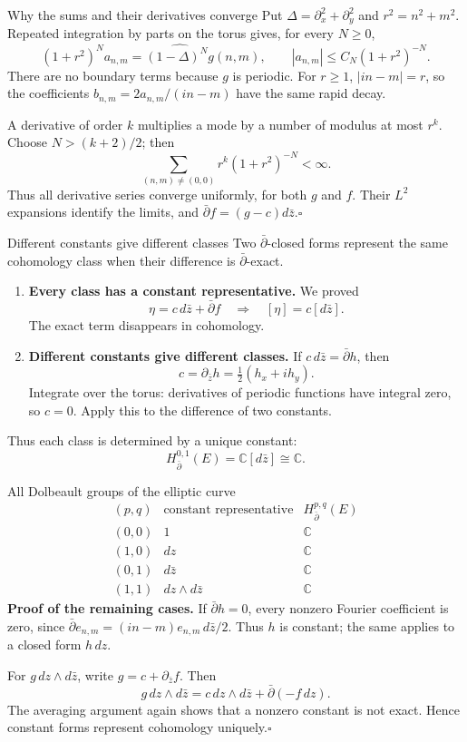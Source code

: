 \documentclass[aspectratio=169,11pt]{beamer}
\newcommand{\db}{\bar\partial}
\newcommand{\C}{\mathbb C}
\newcommand{\ee}{e_{n,m}}
\newcommand{\pbarz}{\partial_{\bar z}}
\begin{document}
\begin{frame}{Why the sums and their derivatives converge}
Put $\Delta=\partial_x^2+\partial_y^2$ and $r^2=n^2+m^2$.
Repeated integration by parts on the torus gives, for every $N\geq0$,
\[
 (1+r^2)^N a_{n,m}=\widehat{(1-\Delta)^N g}(n,m),
 \qquad |a_{n,m}|\leq C_N(1+r^2)^{-N}.
\]
There are no boundary terms because $g$ is periodic.
For $r\geq1$, $|in-m|=r$, so the coefficients
$b_{n,m}=2a_{n,m}/(in-m)$ have the same rapid decay.

A derivative of order $k$ multiplies a mode by a number of modulus at most
$r^k$. Choose $N>(k+2)/2$; then
\[
 \sum_{(n,m)\ne(0,0)} r^k(1+r^2)^{-N}<\infty.
\]
Thus all derivative series converge uniformly, for both $g$ and $f$.
Their $L^2$ expansions identify the limits, and $\db f=(g-c)d\bar z$.\hfill$\square$
\end{frame}

\begin{frame}{Different constants give different classes}
Two $\db$-closed forms represent the same cohomology class when their
difference is $\db$-exact.

\begin{enumerate}
\item \textbf{Every class has a constant representative.}
We proved
\[
 \eta=c\,d\bar z+\db f
 \quad\Longrightarrow\quad [\eta]=c[d\bar z].
\]
The exact term disappears in cohomology.

\item \textbf{Different constants give different classes.}
If $c\,d\bar z=\db h$, then
\[
 c=\pbarz h=\tfrac12(h_x+i h_y).
\]
Integrate over the torus: derivatives of periodic functions have
integral zero, so $c=0$. Apply this to the difference of two constants.
\end{enumerate}

Thus each class is determined by a unique constant:
\[
 H^{0,1}_{\db}(E)=\C[d\bar z]\cong\C.
\]
\end{frame}

\begin{frame}{All Dolbeault groups of the elliptic curve}
\[
\begin{array}{c|c|c}
 (p,q)&\text{constant representative}&H^{p,q}_{\db}(E)\\\hline
 (0,0)&1&\C\\
 (1,0)&dz&\C\\
 (0,1)&d\bar z&\C\\
 (1,1)&dz\wedge d\bar z&\C
\end{array}
\]
\textbf{Proof of the remaining cases.}
If $\db h=0$, every nonzero Fourier coefficient is zero, since
$\db\ee=(in-m)\ee\,d\bar z/2$. Thus $h$ is constant;
the same applies to a closed form $h\,dz$.

For $g\,dz\wedge d\bar z$, write $g=c+\pbarz f$. Then
\[
 g\,dz\wedge d\bar z
 =c\,dz\wedge d\bar z+\db(-f\,dz).
\]
The averaging argument again shows that a nonzero constant is not exact.
Hence constant forms represent cohomology uniquely.\hfill$\square$
\end{frame}
\end{document}
